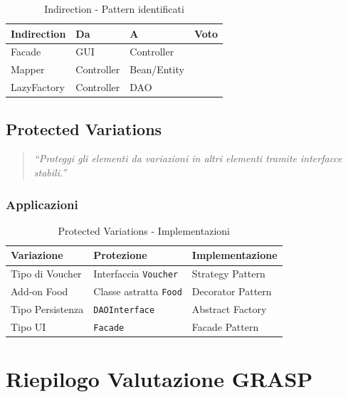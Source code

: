 \documentclass[12pt,a4paper]{article}
\newcommand{\ok}{\textcolor{okgreen}{\checkmark}}
\begin{document}
\begin{table}[h]
\centering
\begin{tabular}{|l|l|l|c|}
\hline
\textbf{Indirection} & \textbf{Da} & \textbf{A} & \textbf{Voto} \\
\hline
Facade & GUI & Controller & \ok \\
\hline
Mapper & Controller & Bean/Entity & \ok \\
\hline
LazyFactory & Controller & DAO & \ok \\
\hline
\end{tabular}
\caption{Indirection - Pattern identificati}
\end{table}

\subsection{Protected Variations}

\begin{quote}
\textit{``Proteggi gli elementi da variazioni in altri elementi tramite interfacce stabili.''}
\end{quote}

\subsubsection{Applicazioni}

\begin{table}[h]
\centering
\begin{tabular}{|l|p{5cm}|p{5cm}|}
\hline
\textbf{Variazione} & \textbf{Protezione} & \textbf{Implementazione} \\
\hline
Tipo di Voucher & Interfaccia \texttt{Voucher} & Strategy Pattern \\
\hline
Add-on Food & Classe astratta \texttt{Food} & Decorator Pattern \\
\hline
Tipo Persistenza & \texttt{DAOInterface} & Abstract Factory \\
\hline
Tipo UI & \texttt{Facade} & Facade Pattern \\
\hline
\end{tabular}
\caption{Protected Variations - Implementazioni}
\end{table}

\section{Riepilogo Valutazione GRASP}
\end{document}

